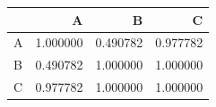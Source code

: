\begin{tabular}{lrrr}
\toprule
 & A & B & C \\
\midrule
A & 1.000000 & 0.490782 & 0.977782 \\
B & 0.490782 & 1.000000 & 1.000000 \\
C & 0.977782 & 1.000000 & 1.000000 \\
\bottomrule
\end{tabular}
